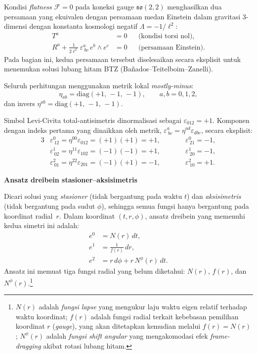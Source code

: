 Kondisi \emph{flatness} $\mathcal{F} = 0$ pada koneksi gauge $\mathfrak{so}(2,2)$ menghasilkan dua persamaan yang ekuivalen dengan persamaan medan Einstein dalam gravitasi 3-dimensi dengan konstanta kosmologi negatif $\Lambda = -1/\ell^2$:
\begin{align}
    T^a &= 0 && \text{(kondisi torsi nol),} \label{b42-eq:torsion-intro}\\[4pt]
    R^a + \frac{1}{2\ell^2}\,\varepsilon^{a}_{\ bc}\,e^b \wedge e^c &= 0 && \text{(persamaan Einstein).} \label{b42-eq:einstein-intro}
\end{align}
Pada bagian ini, kedua persamaan tersebut diselesaikan secara eksplisit untuk menemukan solusi lubang hitam BTZ (Ba\~{n}ados--Teitelboim--Zanelli).
 
Seluruh perhitungan menggunakan metrik lokal \emph{mostly-minus}:
\begin{equation}
    \eta_{ab} = \mathrm{diag}(+1,\,-1,\,-1), \qquad a,b = 0,1,2,
\end{equation}
dan invers $\eta^{ab} = \mathrm{diag}(+1,\,-1,\,-1)$.
 
Simbol Levi-Civita total-antisimetris dinormalisasi sebagai $\varepsilon_{012} = +1$. Komponen dengan indeks pertama yang dinaikkan oleh metrik, $\varepsilon^{a}_{\ bc} = \eta^{ad}\varepsilon_{dbc}$, secara eksplisit:
\begin{alignat}{3}
    &\varepsilon^{0}_{\ 12} = \eta^{00}\varepsilon_{012} = (+1)(+1) = +1, &\qquad &\varepsilon^{0}_{\ 21} = -1, \label{b42-eq:eps0}\\[3pt]
    &\varepsilon^{1}_{\ 02} = \eta^{11}\varepsilon_{102} = (-1)(-1) = +1, &\qquad &\varepsilon^{1}_{\ 20} = -1, \label{b42-eq:eps1}\\[3pt]
    &\varepsilon^{2}_{\ 01} = \eta^{22}\varepsilon_{201} = (-1)(+1) = -1, &\qquad &\varepsilon^{2}_{\ 10} = +1. \label{b42-eq:eps2}
\end{alignat}
 
\vspace{0.5em}
\noindent \textbf{Ansatz dreibein stasioner--aksisimetris}

Dicari solusi yang \emph{stasioner} (tidak bergantung pada waktu $t$) dan \emph{aksisimetris} (tidak bergantung pada sudut $\phi$), sehingga semua fungsi hanya bergantung pada koordinat radial~$r$. Dalam koordinat $(t, r, \phi)$, ansatz dreibein yang memenuhi kedua simetri ini adalah:
\begin{align}
    e^0 &= N(r)\,dt, \label{b42-eq:e0}\\
    e^1 &= \frac{1}{f(r)}\,dr, \label{b42-eq:e1}\\
    e^2 &= r\,d\phi + r\,N^\phi(r)\,dt. \label{b42-eq:e2}
\end{align}
Ansatz ini memuat tiga fungsi radial yang belum diketahui: $N(r)$, $f(r)$, dan $N^\phi(r)$.\footnote{$N(r)$ adalah \emph{fungsi lapse} yang mengukur laju waktu eigen relatif terhadap waktu koordinat; $f(r)$ adalah fungsi radial terkait kebebasan pemilihan koordinat $r$ (\emph{gauge}), yang akan ditetapkan kemudian melalui $f(r) = N(r)$; $N^\phi(r)$ adalah \emph{fungsi shift angular} yang mengakomodasi efek \emph{frame-dragging} akibat rotasi lubang hitam.}
 
